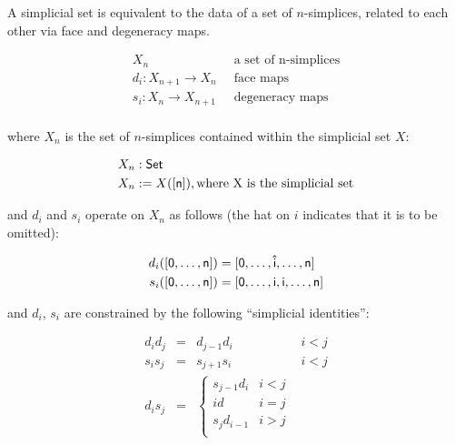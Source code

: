 \documentclass[10pt]{art}
\begin{document}
\begin{definition}
  A simplicial set is equivalent to the data of a set of $n$-simplices, related to each other via face and degeneracy maps.

  \begin{align*}
    X_n                             & \;\;\text{a set of n-simplices} \\
    d_i : X_{n + 1} \rightarrow X_n & \;\;\text{face maps}            \\
    s_i : X_n \rightarrow X_{n + 1} & \;\;\text{degeneracy maps}      \\
  \end{align*}

  where $X_n$ is the set of $n$-simplices contained within the simplicial set $X$:

  \begin{align*}
    X_n & : \mathsf{Set}                                             \\
    X_n & := X(\mathsf{[n]}), \text{where X is the simplicial set} \\
  \end{align*}

  and $d_i$ and $s_i$ operate on $X_n$ as follows (the hat on $i$ indicates that it is to be omitted):

  \begin{align*}
    d_i(\mathsf{[0, \ldots, n]}) & = \mathsf{[0, \ldots, \hat{i}, \ldots, n]} \\
    s_i(\mathsf{[0, \ldots, n]}) & = \mathsf{[0, \ldots, i, i, \ldots, n]}    \\
  \end{align*}

  and $d_i$, $s_i$ are constrained by the following ``simplicial identities'':

  \begin{equation*}
    \begin{matrix}
      d_i d_j & = & d_{j - 1} d_i & i < j \\
      s_i s_j & = & s_{j + 1} s_i & i < j \\
      d_i s_j & = &
      \begin{cases}
        s_{j - 1} d_i & i < j \\
        id            & i = j \\
        s_j d_{i - 1} & i > j \\
      \end{cases}
    \end{matrix}
  \end{equation*}
\end{definition}
\end{document}
